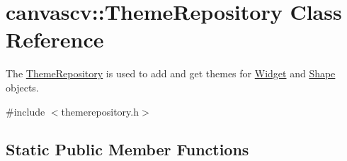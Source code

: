 \hypertarget{classcanvascv_1_1ThemeRepository}{}\section{canvascv\+:\+:Theme\+Repository Class Reference}
\label{classcanvascv_1_1ThemeRepository}


The \hyperlink{classcanvascv_1_1ThemeRepository}{Theme\+Repository} is used to add and get themes for \hyperlink{classcanvascv_1_1Widget}{Widget} and \hyperlink{classcanvascv_1_1Shape}{Shape} objects.  




{\ttfamily \#include $<$themerepository.\+h$>$}

\subsection*{Static Public Member Functions}

